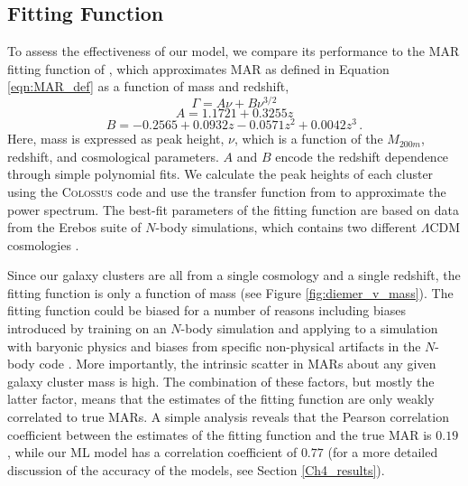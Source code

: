 \subsection{Fitting Function}\label{Diemer_2020}
To assess the effectiveness of our model, we compare its performance to the MAR fitting function of \cite{Diemer_2020}, which approximates MAR as defined in Equation \ref{eqn:MAR_def} as a function of mass and redshift,
\begin{equation}\label{eqn:Diemer_2020}
    \Gamma  = A\nu + B\nu^{3/2}
\end{equation}
\begin{equation}\label{eqn:Diemer_2020_A}
    A = 1.1721 + 0.3255z
\end{equation}
\begin{equation}\label{eqn:Diemer_2020_B}
    B  = -0.2565 + 0.0932z - 0.0571z^2 + 0.0042z^3 \,.
\end{equation}
Here, mass is expressed as peak height, $\nu$, which is a function of the $M_{200m}$, redshift, and cosmological parameters. $A$ and $B$ encode the redshift dependence through simple polynomial fits. We calculate the peak heights of each cluster using the \textsc{Colossus} code \cite{Diemer_2018} and use the transfer function from \cite{Eisenstein_1998} to approximate the power spectrum. The best-fit parameters of the fitting function are based on data from the Erebos suite of $N$-body simulations, which contains two different $\Lambda$CDM cosmologies \cite{Diemer_2020}. 

Since our galaxy clusters are all from a single cosmology and a single redshift, the fitting function is only a function of mass (see Figure \ref{fig:diemer_v_mass}). The fitting function could be biased for a number of reasons including biases introduced by training on an $N$-body simulation and applying to a simulation with baryonic physics and biases from specific non-physical artifacts in the $N$-body code \cite[for a discussion of the robustness of MARs in $N$-body simulations see][]{Soltis_2024}. More importantly, the intrinsic scatter in MARs about any given galaxy cluster mass is high. The combination of these factors, but mostly the latter factor, means that the estimates of the fitting function are only weakly correlated to true MARs. A simple analysis reveals that the Pearson correlation coefficient \cite{Pearson_1895} between the estimates of the fitting function and the true MAR is $0.19$, while our ML model has a correlation coefficient of $0.77$ (for a more detailed discussion of the accuracy of the models, see Section \ref{Ch4_results}).


